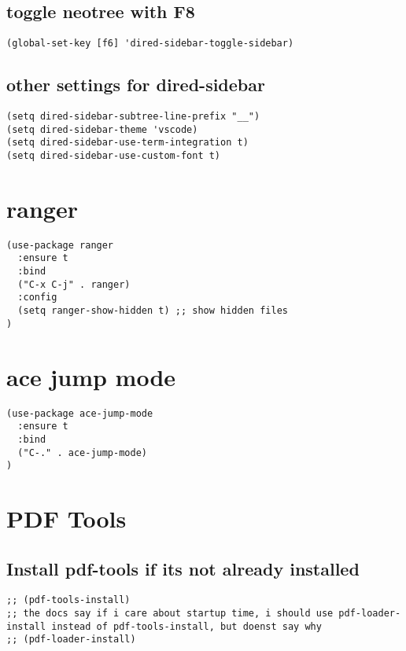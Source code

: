 \documentclass[11pt]{article}
\begin{document}
\subsection*{toggle neotree with F8}
\label{sec:org8b77c57}
\begin{verbatim}
(global-set-key [f6] 'dired-sidebar-toggle-sidebar)
\end{verbatim}

\subsection*{other settings for dired-sidebar}
\label{sec:orgd64659e}
\begin{verbatim}
(setq dired-sidebar-subtree-line-prefix "__")
(setq dired-sidebar-theme 'vscode)
(setq dired-sidebar-use-term-integration t)
(setq dired-sidebar-use-custom-font t)
\end{verbatim}

\section*{ranger}
\label{sec:orga1603e3}

\begin{verbatim}
(use-package ranger
  :ensure t
  :bind
  ("C-x C-j" . ranger)
  :config
  (setq ranger-show-hidden t) ;; show hidden files
)
\end{verbatim}

\section*{ace jump mode}
\label{sec:orge3a3215}
\begin{verbatim}
(use-package ace-jump-mode
  :ensure t
  :bind
  ("C-." . ace-jump-mode)
)
\end{verbatim}

\section*{PDF Tools}
\label{sec:orgd25fe53}

\subsection*{Install pdf-tools if its not already installed}
\label{sec:org77afd08}
\begin{verbatim}
;; (pdf-tools-install)
;; the docs say if i care about startup time, i should use pdf-loader-install instead of pdf-tools-install, but doenst say why
;; (pdf-loader-install)
\end{verbatim}
\end{document}

